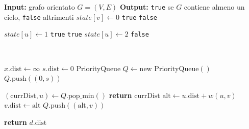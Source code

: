 \documentclass[10pt]{extarticle}
\begin{document}
\begin{algorithm} 
\caption{hasCycle(G = (V, E))}
\begin{algorithmic}[1]
\State \textbf{Input:} grafo orientato $G = (V, E)$
\State \textbf{Output:} \texttt{true} se $G$ contiene almeno un ciclo, \texttt{false} altrimenti
  \State $state[v] \gets 0$ 
\EndFor
{}
      \State \Return \texttt{true}
    \EndIf
  \EndIf
\EndFor
\State \Return \texttt{false}

\medskip

  \State $state[u] \gets 1$ 
      \State \Return \texttt{true} 
    \EndIf
        \State \Return \texttt{true}
      \EndIf
    \EndIf
  \EndFor
  \State $state[u] \gets 2$ 
  \State \Return \texttt{false}
\EndFunction
\end{algorithmic}
\end{algorithm} \\
\begin{algorithm}
\caption{Dijkstra(Grafo $G=(V,E,w)$, sorgente $s$, destinazione $d$)}
\begin{algorithmic}[1]
    \State $x.\text{dist} \gets \infty$
\EndFor
\State $s.\text{dist} \gets 0$
\State PriorityQueue $Q \gets \text{new PriorityQueue}()$
\State $Q.\text{push}((0, s))$ 

    \State $(\text{currDist}, u) \gets Q.\text{pop\_min}()$ 
        \State \textbf{return} $\text{currDist}$ 
    \EndIf
            \State $\text{alt} \gets u.\text{dist} + w(u,v)$
                \State $v.\text{dist} \gets \text{alt}$
                \State $Q.\text{push}((\text{alt}, v))$
            \EndIf
        \EndFor
    \EndIf
\EndWhile

\State \textbf{return} $d.\text{dist}$ 
\end{algorithmic}
\end{algorithm}

\pagebreak
\end{document}
